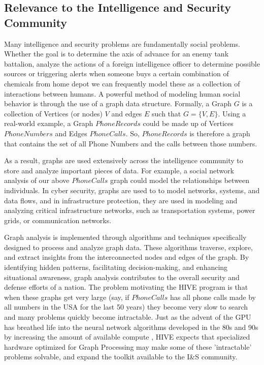 \documentclass[letterpaper, 10pt]{article}
\begin{document}
\begin{multicols}{2}
        \subsection{Relevance to the Intelligence and Security Community}
        Many intelligence and security problems are fundamentally social problems. 
        Whether the goal is to determine the axis of advance for an enemy tank battalion, analyze the actions of a foreign intelligence officer to determine possible sources or triggering alerts when someone buys a certain combination of chemicals from home depot we can frequently model these as a collection of interactions between humans. 
        A powerful method of modeling human social behavior is through the use of a graph data structure.
        Formally, a Graph $G$ is a collection of Vertices (or nodes) $V$ and edges $E$ such that $G=\{V,E\}$.
        Using a real-world example, a Graph $PhoneRecords$ could be made up of Vertices $PhoneNumbers$ and Edges $PhoneCalls$.
        So, $PhoneRecords$ is therefore a graph that contains the set of all Phone Numbers and the calls between those numbers.
        
        As a result, graphs are used extensively across the intelligence community to store and analyze important pieces of data. For example, a social network analysis of our above $PhoneCalls$ graph could model the relationships between individuals. In cyber security, graphs are used to to model networks, systems, and data flows, and in infrastructure protection, they are used in modeling and analyzing critical infrastructure networks, such as transportation systems, power grids, or communication networks. 

        
        Graph analysis is implemented through algorithms and techniques specifically designed to process and analyze graph data. 
        These algorithms traverse, explore, and extract insights from the interconnected nodes and edges of the graph. By identifying hidden patterns, facilitating decision-making, and enhancing situational awareness, graph analysis contributes to the overall security and defense efforts of a nation. 
        The problem motivating the HIVE program is that when these graphs get very large (say, if $PhoneCalls$ has all phone calls made by all numbers in the USA for the last 50 years) they become very slow to search and many problems quickly become intractable.
        Just as the advent of the GPU has breathed life into the neural network algorithms developed in the 80s and 90s by increasing the amount of available compute \cite{Dally2021}, HIVE expects that specialized hardware optimized for Graph Processing may make some of these 'intractable' problems solvable, and expand the toolkit available to the I\&S community. 
        

\end{multicols}
\end{document}
